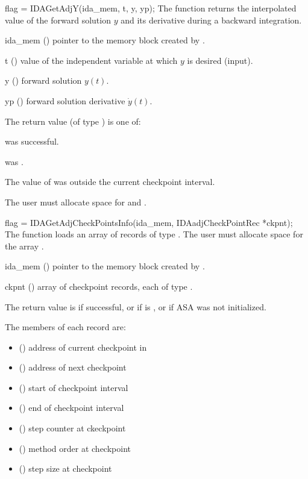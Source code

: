 {
  flag = IDAGetAdjY(ida\_mem, t, y, yp);
}
{
  The function  returns the interpolated value of the
 forward solution $y$ and its derivative during a backward integration.
}
{
  \begin{args}
  \item[ida\_mem] ()
    pointer to the {\idas} memory block created by .
  \item[t] ()
    value of the independent variable at which $y$ is desired (input).
  \item[y] () forward solution $y(t)$.
  \item[yp] () forward solution derivative $\dot{y}(t)$.
  \end{args}
}
{
  The return value  (of type ) is one of:
 \begin{args}
  \item[\Id{IDA\_SUCCESS}]
     was successful.
  \item[\Id{IDA\_MEM\_NULL}]
     was .
  \item[\Id{IDA\_GETY\_BADT}]
    The value of  was outside the current checkpoint interval.
  \end{args}
}
{
  {\warn} The user must allocate space for  and .
}

{
  flag = IDAGetAdjCheckPointsInfo(ida\_mem, IDAadjCheckPointRec *ckpnt);
}
{
  The function  loads an array of 
  records of type .
  The user must allocate space for the array .
}
{
  \begin{args}
  \item[ida\_mem] ()
    pointer to the {\idas} memory block created by .
  \item[ckpnt] ()
    array of  checkpoint records, each of type .
  \end{args}
}
{  The return value is  if successful, or
    if  is , or
    if ASA was not initialized.}
{  The members of each record  are:
\begin{itemize}
 \item {} () address of current checkpoint
        in 
 \item {} () address of next checkpoint
 \item {} () start of checkpoint interval
 \item {} () end of checkpoint interval
 \item {} () step counter at ckeckpoint 
 \item {} () method order at checkpoint 
 \item {} () step size at checkpoint 
\end{itemize}
}


